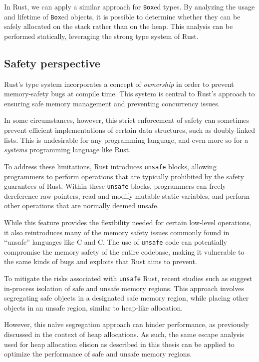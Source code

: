 \documentclass[en]{snu-ece-bsc-thesis}
\theoremstyle{definition}
\def\cplus{\raisebox{.4ex}{\relsize{-3}{\texttt{+}}}}
\def\C++{C\nolinebreak\hspace{-.081em}\cplus\nolinebreak\hspace{-0.02em}\cplus}
\begin{document}
In Rust, we can apply a similar approach for \verb/Box/ed types.
By analyzing the usage and lifetime of \verb/Box/ed objects, it is possible to determine whether they can be safely allocated on the stack rather than on the heap.
This analysis can be performed statically, leveraging the strong type system of Rust.


\subsection{Safety perspective}
Rust's type system incorporates a concept of \emph{ownership} in order to prevent memory-safety bugs at compile time.
This system is central to Rust's approach to ensuring safe memory management and preventing concurrency issues.

In some circumstances, however, this strict enforcement of safety can sometimes prevent efficient implementations of certain data structures, such as doubly-linked lists.
This is undesirable for any programming language, and even more so for a \emph{systems} programming language like Rust.

To address these limitations, Rust introduces \verb/unsafe/ blocks, allowing programmers to perform operations that are typically prohibited by the safety guarantees of Rust.
Within these \verb/unsafe/ blocks, programmers can freely dereference raw pointers, read and modify mutable static variables, and perform other operations that are normally deemed unsafe.

While this feature provides the flexibility needed for certain low-level operations, it also reintroduces many of the memory safety issues commonly found in ``unsafe'' languages like C and \C++{}.
The use of \verb/unsafe/ code can potentially compromise the memory safety of the entire codebase, making it vulnerable to the same kinds of bugs and exploits that Rust aims to prevent.

To mitigate the risks associated with \verb/unsafe/ Rust, recent studies such as \cite{bang23} suggest in-process isolation of safe and unsafe memory regions.
This approach involves segregating safe objects in a designated safe memory region, while placing other objects in an unsafe region, similar to heap-like allocation.

However, this na\"ive segregation approach can hinder performance, as previously discussed in the context of heap allocations.
As such, the same escape analysis used for heap allocation elision as described in this thesis can be applied to optimize the performance of safe and unsafe memory regions.
\end{document}
